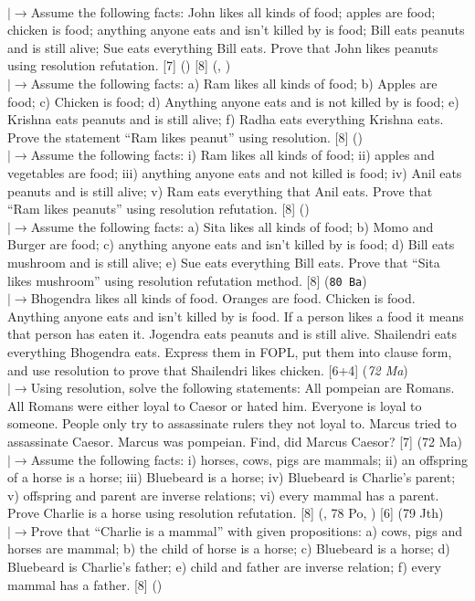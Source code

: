 \documentclass[12pt]{article}
\newcommand{\lb}{\\$\left|\rightarrow\right.$}
\begin{document}
\begin{enumerate}[topsep=0pt, noitemsep]
        \lb Assume the following facts: John likes all kinds of food; apples are food; chicken is food; anything anyone eats and isn't killed by is food; Bill eats peanuts and is still alive; Sue eats everything Bill eats. Prove that John likes peanuts using resolution refutation. \hfill [7] () [8] (, )
        \lb Assume the following facts: a) Ram likes all kinds of food; b) Apples are food; c) Chicken is food; d) Anything anyone eats and is not killed by is food; e) Krishna eats peanuts and is still alive; f) Radha eats everything Krishna eats. Prove the statement ``Ram likes peanut'' using resolution. \hfill [8] ()
        \lb Assume the following facts: i) Ram likes all kinds of food; ii) apples and vegetables are food; iii) anything anyone eats and not killed is food; iv) Anil eats peanuts and is still alive; v) Ram eats everything that Anil eats. Prove that ``Ram likes peanuts'' using resolution refutation. \hfill [8] ()
        \lb Assume the following facts: a) Sita likes all kinds of food; b) Momo and Burger are food; c) anything anyone eats and isn't killed by is food; d) Bill eats mushroom and is still alive; e) Sue eats everything Bill eats. Prove that ``Sita likes mushroom'' using resolution refutation method. \hfill [8] (\texttt{80 Ba})
        \lb Bhogendra likes all kinds of food. Oranges are food. Chicken is food. Anything anyone eats and isn't killed by is food. If a person likes a food it means that person has eaten it. Jogendra eats peanuts and is still alive. Shailendri eats everything Bhogendra eats. Express them in FOPL, put them into clause form, and use resolution to prove that Shailendri likes chicken. \hfill [6+4] (\textit{72 Ma})
        \lb Using resolution, solve the following statements: All pompeian are Romans. All Romans were either loyal to Caesor or hated him. Everyone is loyal to someone. People only try to assassinate rulers they not loyal to. Marcus tried to assassinate Caesor. Marcus was pompeian. Find, did Marcus Caesor? \hfill [7] (72 Ma)
        \lb Assume the following facts: i) horses, cows, pigs are mammals; ii) an offspring of a horse is a horse; iii) Bluebeard is a horse; iv) Bluebeard is Charlie's parent; v) offspring and parent are inverse relations; vi) every mammal has a parent. Prove Charlie is a horse using resolution refutation. \hfill [8] (, 78 Po, ) [6] (79 Jth)
        \lb Prove that ``Charlie is a mammal'' with given propositions: a) cows, pigs and horses are mammal; b) the child of horse is a horse; c) Bluebeard is a horse; d) Bluebeard is Charlie's father; e) child and father are inverse relation; f) every mammal has a father. \hfill [8] ()

\end{enumerate}
\end{document}
